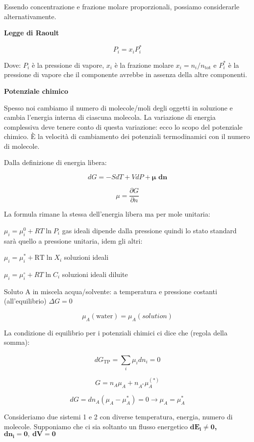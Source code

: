 Essendo concentrazione e frazione molare proporzionali, possiamo
considerarle alternativamente.

\textbf{Legge di Raoult}

\[P_{i} = x_{i}P_{i}^{*}\]

Dove: \(P_{i}\) è la pressione di vapore, \(x_{i}\) è la frazione molare
\(x_{i} = n_{i}/n_{\text{tot}}\) e \(P_{i}^{*}\) è la pressione di
vapore che il componente avrebbe in assenza della altre componenti.

\textbf{Potenziale chimico}

Spesso noi cambiamo il numero di molecole/moli degli oggetti in
soluzione e cambia l'energia interna di ciascuna molecola. La variazione
di energia complessiva deve tenere conto di questa variazione: ecco lo
scopo del potenziale chimico. È la velocità di cambiamento dei
potenziali termodinamici con il numero di molecole.

Dalla definizione di energia libera:

\[dG = - SdT + VdP + \mathbf{\text{μ\ dn}}\]

\[\mu = \frac{\partial G}{\partial n}\]

La formula rimane la stessa dell'energia libera ma per mole unitaria:

\(\mu_{i} = \mu_{i}^{0} + RT\ln P_{i}\) gas ideali dipende dalla
pressione quindi lo stato standard sarà quello a pressione unitaria,
idem gli altri:

\(\mu_{i} = \mu_{i}^{*} + \text{RT}\ln X_{i}\) soluzioni ideali

\(\mu_{i} = \mu_{i}^{\circ} + RT\ln C_{i}\) soluzioni ideali diluite

Soluto A in miscela acqua/solvente: a temperatura e pressione costanti
(all'equilibrio) \(\Delta G = 0\)

\[\mu_{A}\left( \text{water} \right) = \mu_{A}(solution)\]

La condizione di equilibrio per i potenziali chimici ci dice che (regola
della somma):

\[dG_{\text{TP}} = \sum_{i}^{}{\mu_{i}dn_{i}} = 0\]

\[G = n_{A}\mu_{A} + n_{A^{*}}\mu_{A}^{(*)}\]

\[dG = dn_{A}\left( \mu_{A} - \mu_{A}^{*} \right) = 0 \rightarrow \mu_{A} = \mu_{A}^{*}\]

Consideriamo due sistemi 1 e 2 con diverse temperatura, energia, numero
di molecole. Supponiamo che ci sia soltanto un flusso energetico
\(\mathbf{d}\mathbf{E}_{\mathbf{i}}\mathbf{\neq 0}\)\textbf{,}
\(\mathbf{\text{dn}}_{\mathbf{i}}\mathbf{= 0,\ dV = 0}\)

